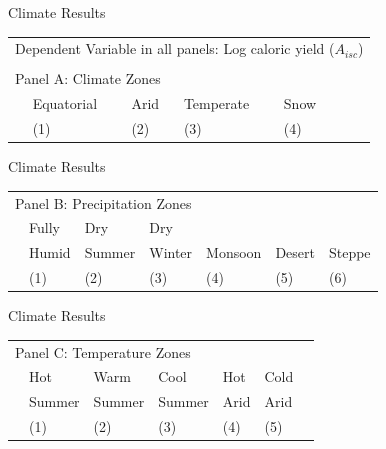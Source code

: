 \documentclass[10pt, xcolor=dvipsnames]{beamer}
\begin{document}
\begin{frame}{Climate Results}\label{climatereg}

{\footnotesize
\begin{tabularx}{\textwidth}{lXXXXXX}
\midrule
\multicolumn{7}{l}{Dependent Variable in all panels: Log caloric yield ($A_{isc}$)} \\ \\
\multicolumn{7}{l}{Panel A: Climate Zones} \\
 & Equatorial & Arid & Temperate & Snow  &     &   \\
 & (1) & (2) & (3) & (4) &  & \\
\midrule

\midrule
\end{tabularx}
}

\hfill \hyperlink{robustness}{}
\end{frame}

\begin{frame}{Climate Results}

{\footnotesize
\begin{tabularx}{\textwidth}{lXXXXXX}
\midrule
\multicolumn{7}{l}{Panel B: Precipitation Zones} \\
& Fully     & Dry         & Dry        &              &            & \\
& Humid & Summer & Winter & Monsoon & Desert & Steppe \\
 & (1) & (2) & (3) & (4) & (5) & (6) \\
\midrule

\midrule
\end{tabularx}
}

\end{frame}

\begin{frame}{Climate Results}

{\footnotesize
\begin{tabularx}{\textwidth}{lXXXXXX}
\midrule
\multicolumn{7}{l}{Panel C: Temperature Zones} \\
    & Hot        & Warm        & Cool       & Hot      & Cold     &  \\
    & Summer & Summer & Summer & Arid & Arid &   \\
 & (1) & (2) & (3) & (4) & (5) &  \\    
\midrule

\midrule
\end{tabularx}
}
\end{frame}
\end{document}
